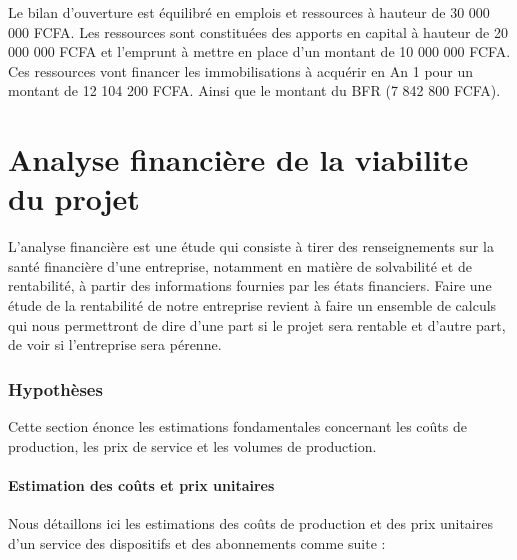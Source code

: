 Le bilan d'ouverture est équilibré en emplois et ressources à hauteur de 30 000 000 FCFA.
Les ressources sont constituées des apports en capital à hauteur de 20 000 000 FCFA et l'emprunt à mettre en place d'un montant de 10 000 000 FCFA. Ces ressources vont financer les immobilisations à acquérir en An 1 pour un montant de 12 104 200 FCFA. Ainsi que le montant du BFR (7 842 800 FCFA).

\section{Analyse financière de la viabilite du projet}

L'analyse financière est une étude qui consiste à tirer des renseignements sur la santé financière d'une entreprise, notamment en matière de solvabilité et de rentabilité, à partir des informations fournies par les états financiers. Faire une étude de la rentabilité de notre entreprise revient à faire un ensemble de calculs qui nous permettront de dire d'une part si le projet sera rentable et d'autre part, de voir si l'entreprise sera pérenne.

\subsubsection{Hypothèses}
Cette section énonce les estimations fondamentales concernant les coûts de production, les prix de service et les volumes de production.

\paragraph{Estimation des coûts et prix unitaires}
Nous détaillons ici les estimations des coûts de production et des prix unitaires d’un service des dispositifs et des abonnements comme suite : 

